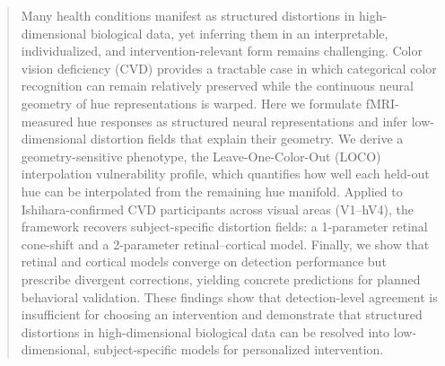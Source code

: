 \documentclass{article}
\begin{document}

\printAffiliationsAndNotice{}

\begin{abstract}
Many health conditions manifest as structured distortions in high-dimensional biological data, yet inferring them in an interpretable, individualized, and intervention-relevant form remains challenging.
Color vision deficiency (CVD) provides a tractable case in which categorical color recognition can remain relatively preserved while the continuous neural geometry of hue representations is warped.
Here we formulate fMRI-measured hue responses as structured neural representations and infer low-dimensional distortion fields that explain their geometry.
We derive a geometry-sensitive phenotype, the Leave-One-Color-Out (LOCO) interpolation vulnerability profile, which quantifies how well each held-out hue can be interpolated from the remaining hue manifold.
Applied to Ishihara-confirmed CVD participants across visual areas (V1--hV4), the framework recovers subject-specific distortion fields: a 1-parameter retinal cone-shift and a 2-parameter retinal--cortical model.
Finally, we show that retinal and cortical models converge on detection performance but prescribe divergent corrections, yielding concrete predictions for planned behavioral validation.
These findings show that detection-level agreement is insufficient for choosing an intervention and demonstrate that structured distortions in high-dimensional biological data can be resolved into low-dimensional, subject-specific models for personalized intervention.
\end{abstract}
\end{document}
